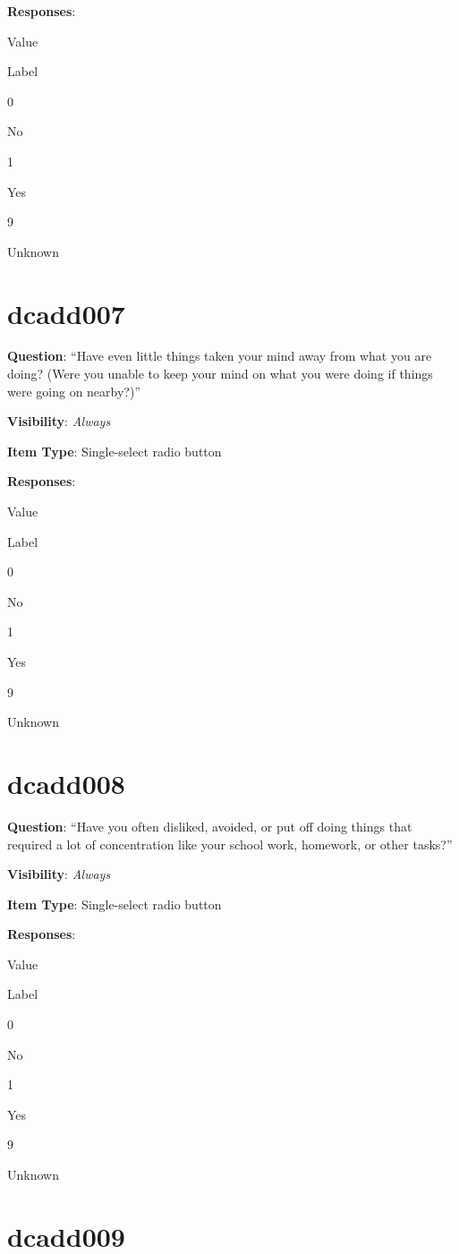 \documentclass[]{book}
\begin{document}
\textbf{Responses}:

Value

Label

0

No

1

Yes

9

Unknown

\hypertarget{dcadd007}{%
\section{dcadd007}\label{dcadd007}}

\textbf{Question}: ``Have even little things taken your mind away from what you are doing? (Were you unable to keep your mind on what you were doing if things were going on nearby?)''

\textbf{Visibility}: \emph{Always}

\textbf{Item Type}: Single-select radio button

\textbf{Responses}:

Value

Label

0

No

1

Yes

9

Unknown

\hypertarget{dcadd008}{%
\section{dcadd008}\label{dcadd008}}

\textbf{Question}: ``Have you often disliked, avoided, or put off doing things that required a lot of concentration like your school work, homework, or other tasks?''

\textbf{Visibility}: \emph{Always}

\textbf{Item Type}: Single-select radio button

\textbf{Responses}:

Value

Label

0

No

1

Yes

9

Unknown

\hypertarget{dcadd009}{%
\section{dcadd009}\label{dcadd009}}
\end{document}
